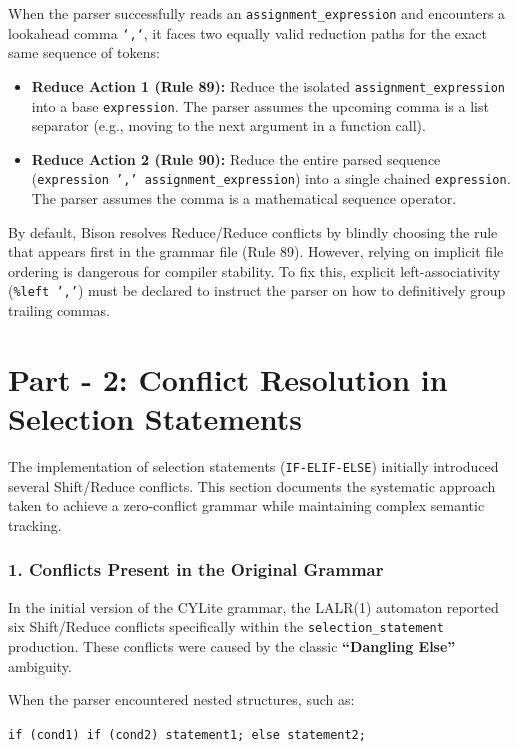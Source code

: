 \documentclass[a4paper,12pt]{article}
\begin{document}
When the parser successfully reads an \texttt{assignment\_expression} and encounters a lookahead comma \texttt{`,`}, it faces two equally valid reduction paths for the exact same sequence of tokens:
\begin{itemize}
    \item \textbf{Reduce Action 1 (Rule 89):} Reduce the isolated \texttt{assignment\_expression} into a base \texttt{expression}. The parser assumes the upcoming comma is a list separator (e.g., moving to the next argument in a function call).
    \item \textbf{Reduce Action 2 (Rule 90):} Reduce the entire parsed sequence (\texttt{expression ',' assignment\_expression}) into a single chained \texttt{expression}. The parser assumes the comma is a mathematical sequence operator.
\end{itemize}
By default, Bison resolves Reduce/Reduce conflicts by blindly choosing the rule that appears first in the grammar file (Rule 89). However, relying on implicit file ordering is dangerous for compiler stability. To fix this, explicit left-associativity (\texttt{\%left ','}) must be declared to instruct the parser on how to definitively group trailing commas.

\section{Part - 2: Conflict Resolution in Selection Statements}

The implementation of selection statements (\texttt{IF-ELIF-ELSE}) initially introduced several Shift/Reduce conflicts. This section documents the systematic approach taken to achieve a zero-conflict grammar while maintaining complex semantic tracking.

\subsubsection*{1. Conflicts Present in the Original Grammar}
In the initial version of the CYLite grammar, the LALR(1) automaton reported six Shift/Reduce conflicts specifically within the \texttt{selection\_statement} production. These conflicts were caused by the classic \textbf{``Dangling Else''} ambiguity.

When the parser encountered nested structures, such as:
\begin{center}
\texttt{if (cond1) if (cond2) statement1; else statement2;}
\end{center}
\end{document}
